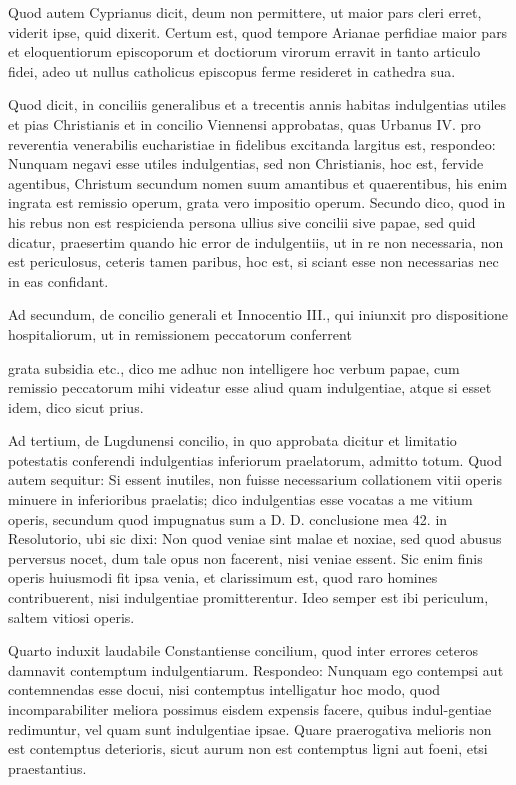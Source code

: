 Quod autem Cyprianus dicit, deum non permittere, ut maior pars cleri erret, viderit ipse, quid dixerit. Certum est, quod tempore Arianae perfidiae maior pars et eloquentiorum episcoporum et doctiorum virorum erravit in tanto articulo fidei, adeo ut nullus catholicus episcopus ferme resideret in cathedra sua.

Quod dicit, in conciliis generalibus et a trecentis annis habitas indulgentias utiles et pias Christianis et in concilio Viennensi approbatas, quas Urbanus IV. pro reverentia venerabilis eucharistiae in fidelibus excitanda largitus est, respondeo: Nunquam negavi esse utiles indulgentias, sed non Christianis, hoc est, fervide agentibus, Christum secundum nomen suum amantibus et quaerentibus, his enim ingrata est remissio operum, grata vero impositio operum. Secundo dico, quod in his rebus non est respicienda persona ullius sive concilii sive papae, sed quid dicatur, praesertim quando hic error de indulgentiis, ut in re non necessaria, non est periculosus, ceteris tamen paribus, hoc est, si sciant esse non necessarias nec in eas confidant.

Ad secundum, de concilio generali et Innocentio III., qui iniunxit pro dispositione hospitaliorum, ut in remissionem peccatorum conferrent

grata subsidia etc., dico me adhuc non intelligere hoc verbum papae, cum remissio peccatorum mihi videatur esse aliud quam indulgentiae, atque si esset idem, dico sicut prius.

Ad tertium, de Lugdunensi concilio, in quo approbata dicitur et limitatio potestatis conferendi indulgentias inferiorum praelatorum, admitto totum. Quod autem sequitur: Si essent inutiles, non fuisse necessarium collationem vitii operis minuere in inferioribus praelatis; dico indulgentias esse vocatas a me vitium operis, secundum quod impugnatus sum a D. D. conclusione mea 42. in Resolutorio, ubi sic dixi: Non quod veniae sint malae et noxiae, sed quod abusus perversus nocet, dum tale opus non facerent, nisi veniae essent. Sic enim finis operis huiusmodi fit ipsa venia, et clarissimum est, quod raro homines contribuerent, nisi indulgentiae promitterentur. Ideo semper est ibi periculum, saltem vitiosi operis.

Quarto induxit laudabile Constantiense concilium, quod inter errores ceteros damnavit contemptum indulgentiarum. Respondeo: Nunquam ego contempsi aut contemnendas esse docui, nisi contemptus intelligatur hoc modo, quod incomparabiliter meliora possimus eisdem expensis facere, quibus indul-\marginpar{\small[348]}gentiae redimuntur, vel quam sunt indulgentiae ipsae. Quare praerogativa melioris non est contemptus deterioris, sicut aurum non est contemptus ligni aut foeni, etsi praestantius.

